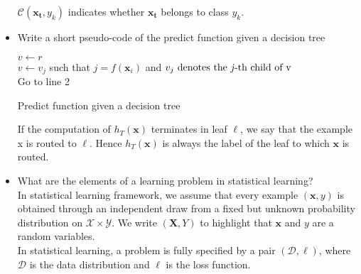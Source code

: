 \begin{itemize}
        $\mathcal{C}(\boldsymbol{x_{t}}, y_{k})$ indicates whether $\boldsymbol{x_{t}}$ belongs to class $y_{k}$.\\


    \item Write a short pseudo-code of the predict function given a decision tree\\
        
        \begin{algorithm}[H]
            \SetAlgoLined
            \DontPrintSemicolon
            $v \gets r$\\
             {                
            }
             {                
                $v \gets v_j$ such that $j = f(\boldsymbol{x}_i)$ and $v_j\ \textmd{denotes the \textit{j}-th child of v} $\\
            }
            Go to line 2
            \caption{Predict function given a decision tree}
        \end{algorithm}
        If the computation of $h_T(\boldsymbol{x})$ terminates in leaf $\ell$, we say that the example x is routed to $\ell$. Hence $h_T(\boldsymbol{x})$ is always the label of the leaf to which $\boldsymbol{x}$ is routed.

    \item What are the elements of a learning problem in statistical learning?\\

        In statistical learning framework, we assume that every example $(\boldsymbol{x}, y)$ is obtained through an independent draw from a fixed but unknown probability distribution on $\mathcal{X} \times \mathcal{Y}$. We write $(\boldsymbol{X}, Y)$ to highlight that $\boldsymbol{x}$ and $y$ are a random variables.\\
        In statistical learning, a problem is fully specified by a pair $(\mathcal{D}, \ell)$, where $\mathcal{D}$ is the data distribution and $\ell$ is the loss function.\\


\end{itemize}
